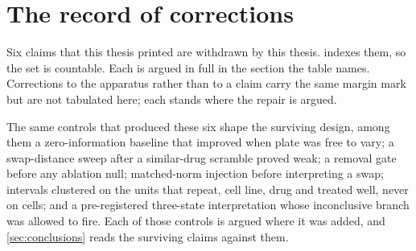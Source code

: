 \section*{The record of corrections}

\noindent
Six claims that this thesis printed are withdrawn by this thesis.
 indexes them, so the set is countable. Each is argued in
full in the section the table names. Corrections to the apparatus rather than to
a claim carry the same margin mark but are not tabulated here; each stands where
the repair is argued.

The same controls that produced these six shape the surviving design, among
them a zero-information baseline that improved when plate was free to vary; a
swap-distance sweep after a similar-drug scramble proved weak; a removal gate
before any ablation null; matched-norm injection before interpreting a swap;
intervals clustered on the units that repeat, cell line, drug and treated well,
never on cells; and a pre-registered three-state
interpretation whose inconclusive branch was allowed to fire. Each of those controls is argued where it was added, and \cref{sec:conclusions} reads the surviving claims against them.

